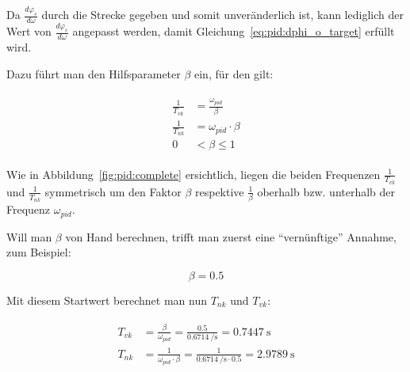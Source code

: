 Da   $\frac{d\varphi_s}{d\omega}$  durch   die  Strecke   gegeben  und   somit
unver\"anderlich ist, kann lediglich der Wert von $\frac{d\varphi_r}{d\omega}$
angepasst werden, damit Gleichung~\ref{eq:pid:dphi_o_target} erf\"ullt wird.

Dazu f\"uhrt man den Hilfsparameter $\beta$ ein, f\"ur den gilt:

\begin{gather} \label{eq:pid:beta:start}
    \begin{split}
        \frac{1}{T_{vk}} & = \frac{\omega_{pid}}{\beta} \\
        \frac{1}{T_{nk}} & = \omega_{pid} \cdot \beta  \\
                       0 & <  \beta \leq 1
    \end{split}
\end{gather}

Wie  in  Abbildung~\ref{fig:pid:complete} ersichtlich\footnotemark[8],  liegen
die beiden Frequenzen $\frac{1}{T_{vk}}$ und $\frac{1}{T_{nk}}$ symmetrisch um
den Faktor  $\beta$ respektive  $\frac{1}{\beta}$ oberhalb bzw.  unterhalb der
Frequenz $\omega_{pid}$.



Will man $\beta$ von Hand  berechnen, trifft man zuerst eine ``vern\"unftige''
Annahme, zum Beispiel:

\begin{equation} \label{eq:pid:beta:initial_value}
    \beta = 0.5
\end{equation}

Mit diesem Startwert berechnet man nun $T_{nk}$ und ${T_{vk}}$:

\begin{gather} \label{eq:pid:t_nk_t_vk_initial_results}
    \begin{split}
        {T_{vk}} & = \frac{\beta}{\omega_{pid}}  = \frac{0.5}{\SI{0.6714}{\per\second}}                   = \SI{0.7447}{\second} \\
        {T_{nk}} & = \frac{1}{\omega_{pid} \cdot \beta} = \frac{1}{\SI{0.6714}{\per\second} \cdot 0.5 }  = \SI{2.9789}{\second} \\
    \end{split}
\end{gather}

